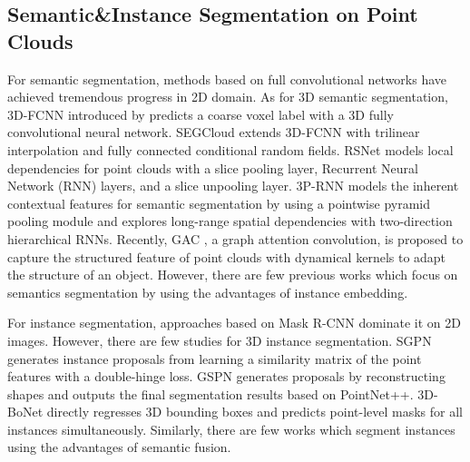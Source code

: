 \documentclass[letterpaper]{article} \usepackage{aaai20}  \usepackage{times}  \usepackage{helvet} \usepackage{courier}  \usepackage[hyphens]{url}  \usepackage{graphicx} \urlstyle{rm} \def\UrlFont{\rm}  \usepackage{graphicx}  \frenchspacing  \setlength{\pdfpagewidth}{8.5in}  \setlength{\pdfpageheight}{11in}
\begin{document}
\subsection{Semantic\&Instance Segmentation on Point Clouds}
For semantic segmentation, methods \cite{Zhao_2017_CVPR,deeplabv3plus2018} based on full convolutional networks \cite{Long_2015_CVPR} have achieved tremendous progress in 2D domain. As for 3D semantic segmentation, 3D-FCNN introduced by \cite{huang2016point} predicts a coarse voxel label with a 3D fully convolutional neural network. SEGCloud \cite{tchapmi2017segcloud} extends 3D-FCNN with trilinear interpolation and fully connected conditional random fields. RSNet \cite{huang2018recurrent} models local dependencies for point clouds with a slice pooling layer, Recurrent Neural Network (RNN) layers, and a slice unpooling layer. 3P-RNN \cite{ye20183d} models the inherent contextual features for semantic segmentation by using a pointwise pyramid pooling module and explores long-range spatial dependencies with two-direction hierarchical RNNs. Recently, GAC \cite{wang2019graph}, a graph attention convolution, is proposed to capture the structured feature of point clouds with dynamical kernels to adapt the structure of an object. However, there are few previous works which focus on semantics segmentation by using the advantages of instance embedding.

For instance segmentation, approaches \cite{li2018attention,huang2019msrcnn} based on Mask R-CNN \cite{he2017mask} dominate it on 2D images. However, there are few studies for 3D instance segmentation. SGPN \cite{Wang_2018_CVPR} generates instance proposals from learning a similarity matrix of the point features with a double-hinge loss. GSPN \cite{yi2019gspn} generates proposals by reconstructing shapes and outputs the final segmentation results based on PointNet++. 3D-BoNet \cite{yang2019learning} directly regresses 3D bounding boxes and predicts point-level masks for all instances simultaneously. Similarly, there are few works which segment instances using the advantages of semantic fusion.
\end{document}
